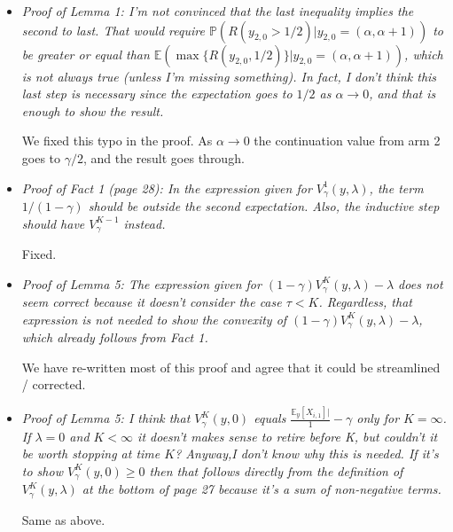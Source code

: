 \documentclass[11pt]{article}
\newcommand{\1}{\ensuremath{\mathbf{1}}} %
\theoremstyle{thm-sf}
\begin{document}
\begin{enumerate}
		\begin{itemize}
			\item {\it Proof of Lemma 1: I'm not convinced that the last inequality implies the second to last.
			 That would require $\mathbb P(R(y_{2,0} > 1/2)| y_{2,0} = (\alpha, \alpha + 1))$ to be greater or equal than $\mathbb E (\max \{R(y_{2,0}, 1/2 )\} | y_{2,0} = (\alpha, \alpha + 1))$, which is not always true (unless I'm missing something).
			 In fact, I don't think this last step is necessary since the expectation goes to $1/2$ as $\alpha \to 0$, and that is enough to show the result.}
			 
			 We fixed this typo in the proof. As $\alpha \to 0$ the continuation value from arm 2 goes to $\gamma/2$, and the result goes through.
			 
			 \item {\it Proof of Fact 1 (page 28): In the expression given for $V^1_\gamma(y, \lambda)$, the term $1/(1-\gamma)$ should be outside the second expectation. Also, the inductive step should have $V^{K-1}_\gamma$ instead.}
			 
			 Fixed.
			 
			 \item {\it Proof of Lemma 5: The expression given for $(1 - \gamma) V_\gamma^K (y, \lambda) - \lambda$ does not seem correct because it doesn't consider the case $\tau < K$. Regardless, that expression is not needed to show the convexity of $(1 - \gamma) V_\gamma^K (y, \lambda) - \lambda$, which already follows from Fact 1.}
			 
			 We have re-written most of this proof and agree that it could be streamlined / corrected.
			 
			 \item {\it Proof of Lemma 5: I think that $V^{K}_\gamma(y, 0)$ equals $\frac{\mathbb E_y[X_{i,1}]|}1-\gamma$ only for $K = \infty$. If $\lambda = 0$ and $K < \infty$ it doesn't makes sense to retire before K, but couldn't it be worth stopping at time $K$? Anyway,I don't know why this is needed. If it's to show $V^{K}_\gamma(y, 0) \geq 0$ then that follows directly from the definition of $V^{K}_\gamma(y, \lambda)$ at the bottom of page 27 because it's a sum of non-negative terms.}
			 
			 Same as above.
			 

\end{itemize}
\end{enumerate}
\end{document}
